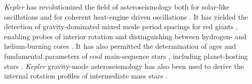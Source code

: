 \documentclass[a4paper,fleqn,usenatbib]{mnras}
\newcommand{\kepler}{\textit{Kepler}\xspace}
\begin{document}
\kepler has revolutionized the field of asteroseismology both for solar-like oscillations \citep{2010PASP..122..131G,2010ApJ...713L.169C} and for coherent heat-engine driven oscillations \citep{2018arXiv180907779A}. It has yielded the detection of gravity-dominated mixed mode period spacings for red giants \citep{rggmodes,2014A&A...572L...5M}, enabling probes of interior rotation \citep{rggmoderotation,2012A&A...548A..10M,2012ApJ...756...19D} and distinguishing between hydrogen- and helium-burning cores \citep{rggmodehelium,2012A&A...540A.143M}. It has also permitted the determination of ages and fundamental parameters of cool main-sequence stars \citep{silvaages}, including planet-hosting stars \citep{huberplanetages,silvaaguirre2015,2016MNRAS.456.2183D,2018MNRAS.479.4786V}. \kepler gravity-mode asteroseismology has also been used to derive the internal rotation profiles of intermediate mass stars \citep{triana15,vanreeth18}. %
\newpage
\end{document}
